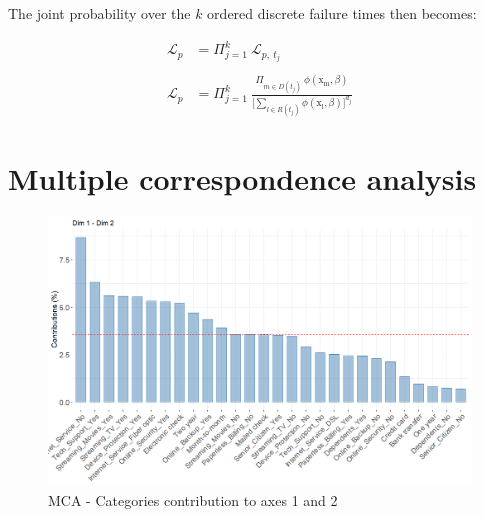 \documentclass[
]{book}
\begin{document}
The joint probability over the \(k\) ordered discrete failure times then becomes:

\begin{equation}
\begin{aligned}
  \mathcal{L}_p & = \Pi_{j=1}^{k} \ \mathcal{L}_{p,\ t_j} \\\\
  \mathcal{L}_p & = \Pi_{j=1}^{k} \ \frac{\Pi_{m \in D(t_j)} \ \phi(\mathrm{x_m}, \beta)}{\Big[\sum_{l \in R(t_j)} \phi(\mathrm{x_l}, \beta)\Big]^{d_j}}
\end{aligned}
\label{eq:partlikproofbis}
\end{equation}

\hypertarget{mcaappendix}{%
\section*{Multiple correspondence analysis}\label{mcaappendix}}

\begin{figure}

{\centering \includegraphics[width=15.28in]{./imgs/mca_contrib_12} 

}

\caption{MCA -  Categories contribution to axes 1 and 2}\label{fig:mcacontrib12}
\end{figure}
\end{document}
